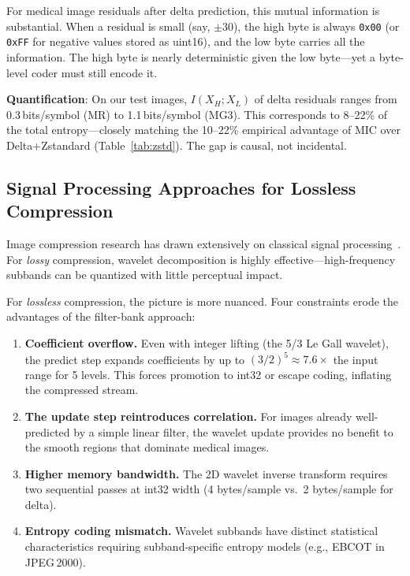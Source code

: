 \documentclass[10pt,twocolumn]{article}
\begin{document}
For medical image residuals after delta prediction, this mutual information is substantial. When a residual is small (say, $\pm 30$), the high byte is always \texttt{0x00} (or \texttt{0xFF} for negative values stored as uint16), and the low byte carries all the information. The high byte is nearly deterministic given the low byte---yet a byte-level coder must still encode it.

\textbf{Quantification}: On our test images, $I(X_H; X_L)$ of delta residuals ranges from 0.3\,bits/symbol (MR) to 1.1\,bits/symbol (MG3). This corresponds to 8--22\% of the total entropy---closely matching the 10--22\% empirical advantage of MIC over Delta+Zstandard (Table~\ref{tab:zstd}). The gap is causal, not incidental.

\subsection{Signal Processing Approaches for Lossless Compression}

Image compression research has drawn extensively on classical signal processing~\cite{legall1988,sweldens1996,daubechies1998,calderbank1998}. For \emph{lossy} compression, wavelet decomposition is highly effective---high-frequency subbands can be quantized with little perceptual impact.

For \emph{lossless} compression, the picture is more nuanced. Four constraints erode the advantages of the filter-bank approach:

\begin{enumerate}
  \item \textbf{Coefficient overflow.} Even with integer lifting (the 5/3 Le Gall wavelet), the predict step expands coefficients by up to $(3/2)^5 \approx 7.6\times$ the input range for 5 levels. This forces promotion to int32 or escape coding, inflating the compressed stream.

  \item \textbf{The update step reintroduces correlation.} For images already well-predicted by a simple linear filter, the wavelet update provides no benefit to the smooth regions that dominate medical images.

  \item \textbf{Higher memory bandwidth.} The 2D wavelet inverse transform requires two sequential passes at int32 width (4 bytes/sample vs.\ 2 bytes/sample for delta).

  \item \textbf{Entropy coding mismatch.} Wavelet subbands have distinct statistical characteristics requiring subband-specific entropy models (e.g., EBCOT in JPEG\,2000).
\end{enumerate}
\end{document}
